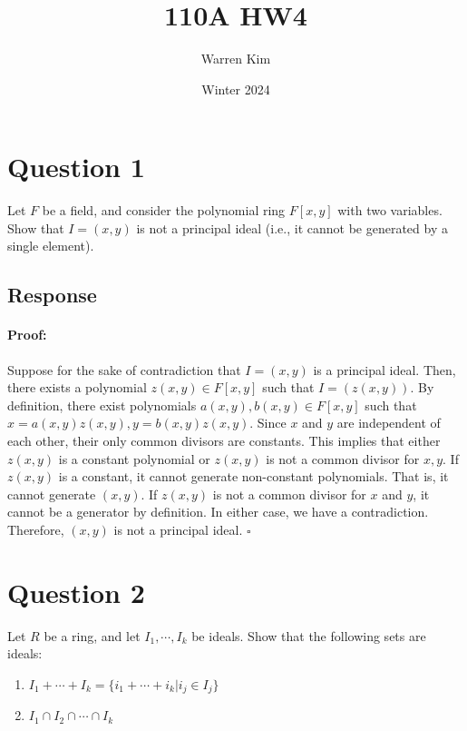 \documentclass [12pt] {article}
\title{110A HW4}
\author{Warren Kim}
\date{Winter 2024}
\newenvironment{proof}{\paragraph{Proof:}}{\hfill$\square$}
\begin{document}
\maketitle

\section*{Question 1}
Let $F$ be a field, and consider the polynomial ring $F[x,y]$ with two variables. Show that $I=(x,y)$ is not a principal ideal (i.e., it cannot be generated by a single element). 
\subsection*{Response}
\begin{proof}
    Suppose for the sake of contradiction that $I = (x, y)$ is a principal ideal. Then, there exists a
    polynomial $z(x, y) \in F[x, y]$ such that $I = (z(x, y))$. By definition, there exist polynomials
    $a(x, y), b(x, y) \in F[x, y]$ such that $x = a(x, y) z(x, y), y = b(x, y) z(x, y)$. 
    Since $x$ and $y$ are independent of each other, their only common divisors are constants. This
    implies that either $z(x, y)$ is a constant polynomial or
    $z(x, y)$ is not a common divisor for $x, y$. If $z(x, y)$ is a constant, it cannot generate 
    non-constant polynomials. That is, it cannot generate $(x, y)$. If $z(x, y)$ is not 
    a common divisor for $x$ and $y$, it cannot be a generator by definition.
    In either case, we have a contradiction. Therefore, $(x, y)$ is not a principal ideal.
\end{proof}
\newpage

\section*{Question 2}
Let $R$ be a ring, and let $I_1,\cdots,I_k$ be ideals. Show that the following sets are ideals: 
\begin{enumerate}
    \item $I_1+\cdots+I_k=\{i_1+\cdots+i_k|i_j\in I_j\}$
    \item $I_1\cap I_2\cap \cdots\cap I_k$
\end{enumerate}
\vspace{-1em}
\end{document}

